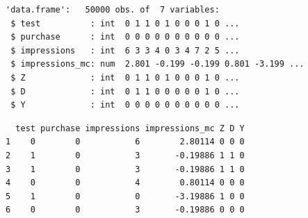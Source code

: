 \begin{Shaded}
\begin{Highlighting}[]
\OtherTok{\textless{}{-}} \NormalTok{(}\NormalTok{, } \NormalTok{, } \NormalTok{,}
                  \NormalTok{)}
\SpecialCharTok{$}\OtherTok{\textless{}{-}}\SpecialCharTok{$}
\SpecialCharTok{$}\OtherTok{\textless{}{-}} \SpecialCharTok{$}\SpecialCharTok{==}  \SpecialCharTok{\&}\SpecialCharTok{$}\SpecialCharTok{\textgreater{}} \NormalTok{)}
\SpecialCharTok{$}\OtherTok{\textless{}{-}}\SpecialCharTok{$}

\end{Highlighting}
\end{Shaded}

\begin{verbatim}
'data.frame':   50000 obs. of  7 variables:
 $ test          : int  0 1 1 0 1 0 0 0 1 0 ...
 $ purchase      : int  0 0 0 0 0 0 0 0 0 0 ...
 $ impressions   : int  6 3 3 4 0 3 4 7 2 5 ...
 $ impressions_mc: num  2.801 -0.199 -0.199 0.801 -3.199 ...
 $ Z             : int  0 1 1 0 1 0 0 0 1 0 ...
 $ D             : int  0 1 1 0 0 0 0 0 1 0 ...
 $ Y             : int  0 0 0 0 0 0 0 0 0 0 ...
\end{verbatim}

\begin{Shaded}
\begin{Highlighting}[]
\end{Highlighting}
\end{Shaded}

\begin{verbatim}
  test purchase impressions impressions_mc Z D Y
1    0        0           6        2.80114 0 0 0
2    1        0           3       -0.19886 1 1 0
3    1        0           3       -0.19886 1 1 0
4    0        0           4        0.80114 0 0 0
5    1        0           0       -3.19886 1 0 0
6    0        0           3       -0.19886 0 0 0
\end{verbatim}

